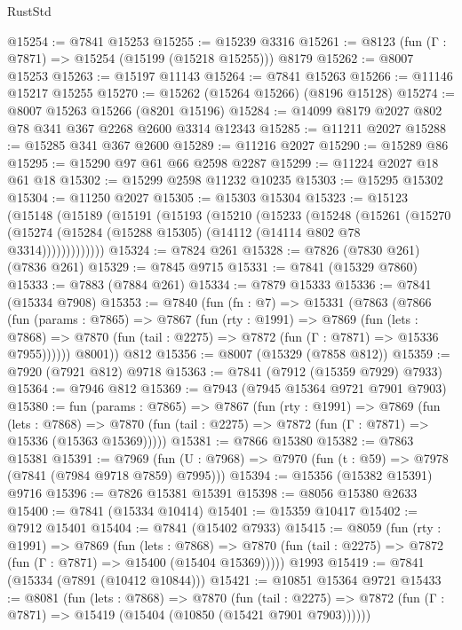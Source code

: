 \begin{lexlean}{RustStd}
\begin{coremodule}
{\begin{coremodule}
{{{{{{{{{{{{{{{{{{{{{{{{{{{{{{{{{{{{{{{{{{{{{{{{{{{{{{@15254 := @7841 @15253
@15255 := @15239 @3316
@15261 := @8123 (fun (Γ : @7871) => @15254 (@15199 (@15218 @15255))) @8179
@15262 := @8007 @15253
@15263 := @15197 @11143
@15264 := @7841 @15263
@15266 := @11146 @15217 @15255
@15270 := @15262 (@15264 @15266) (@8196 @15128)
@15274 := @8007 @15263 @15266 (@8201 @15196)
@15284 := @14099 @8179 @2027 @802 @78 @341 @367 @2268 @2600 @3314 @12343
@15285 := @11211 @2027
@15288 := @15285 @341 @367 @2600
@15289 := @11216 @2027
@15290 := @15289 @86
@15295 := @15290 @97 @61 @66 @2598 @2287
@15299 := @11224 @2027 @18 @61 @18
@15302 := @15299 @2598 @11232 @10235
@15303 := @15295 @15302
@15304 := @11250 @2027
@15305 := @15303 @15304
@15323 := @15123
    (@15148
      (@15189
        (@15191
          (@15193
            (@15210
              (@15233
                (@15248
                  (@15261
                    (@15270
                      (@15274 (@15284 (@15288 @15305) (@14112 (@14114 @802 @78 @3314)))))))))))))
@15324 := @7824 @261
@15328 := @7826 (@7830 @261) (@7836 @261)
@15329 := @7845 @9715
@15331 := @7841 (@15329 @7860)
@15333 := @7883 (@7884 @261)
@15334 := @7879 @15333
@15336 := @7841 (@15334 @7908)
@15353 := @7840
    (fun (fn : @7) =>
    @15331
      (@7863
        (@7866
          (fun (params : @7865) =>
          @7867
            (fun (rty : @1991) =>
            @7869
              (fun (lets : @7868) =>
              @7870 (fun (tail : @2275) => @7872 (fun (Γ : @7871) => @15336 @7955))))))
        @8001))
    @812
@15356 := @8007 (@15329 (@7858 @812))
@15359 := @7920 (@7921 @812) @9718
@15363 := @7841 (@7912 (@15359 @7929) @7933)
@15364 := @7946 @812
@15369 := @7943 (@7945 @15364 @9721 @7901 @7903)
@15380 := fun (params : @7865) =>
  @7867
    (fun (rty : @1991) =>
    @7869
      (fun (lets : @7868) =>
      @7870 (fun (tail : @2275) => @7872 (fun (Γ : @7871) => @15336 (@15363 @15369)))))
@15381 := @7866 @15380
@15382 := @7863 @15381
@15391 := @7969
    (fun (U : @7968) => @7970 (fun (t : @59) => @7978 (@7841 (@7984 @9718 @7859) @7995)))
@15394 := @15356 (@15382 @15391) @9716
@15396 := @7826 @15381 @15391
@15398 := @8056 @15380 @2633
@15400 := @7841 (@15334 @10414)
@15401 := @15359 @10417
@15402 := @7912 @15401
@15404 := @7841 (@15402 @7933)
@15415 := @8059
    (fun (rty : @1991) =>
    @7869
      (fun (lets : @7868) =>
      @7870 (fun (tail : @2275) => @7872 (fun (Γ : @7871) => @15400 (@15404 @15369)))))
    @1993
@15419 := @7841 (@15334 (@7891 (@10412 @10844)))
@15421 := @10851 @15364 @9721
@15433 := @8081
    (fun (lets : @7868) =>
    @7870
      (fun (tail : @2275) =>
      @7872 (fun (Γ : @7871) => @15419 (@15404 (@10850 (@15421 @7901 @7903))))))
}}}}}}}}}}}}}}}}}}}}}}}}}}}}}}}}}}}}}}}}}}}}}}}}}}}}}}
\end{coremodule}}
\end{coremodule}
\end{lexlean}

